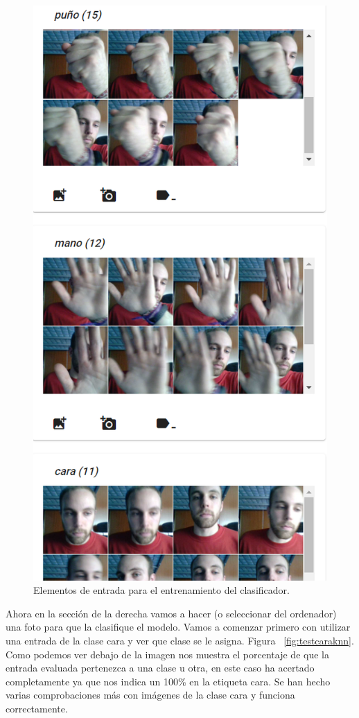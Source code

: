 \documentclass[a4paper, 12pt]{book}
\begin{document}
\begin{figure}
	\centering
	\includegraphics[width=12cm, keepaspectratio]{img/fotosentrada}
	\caption{Elementos de entrada para el entrenamiento del clasificador.}			
	\label{fig:fotosentrada}
\end{figure}

Ahora en la sección de la derecha vamos a hacer (o seleccionar del ordenador) una foto para que la clasifique el modelo. Vamos a comenzar primero con utilizar una entrada de la clase cara y ver que clase se le asigna. Figura ~\ref{fig:testcaraknn}. Como podemos ver debajo de la imagen nos muestra el porcentaje de que la entrada evaluada pertenezca a una clase u otra, en este caso ha acertado completamente ya que nos indica un 100\% en la etiqueta cara. Se han hecho varias comprobaciones más con imágenes de la clase cara y funciona correctamente.
\end{document}
